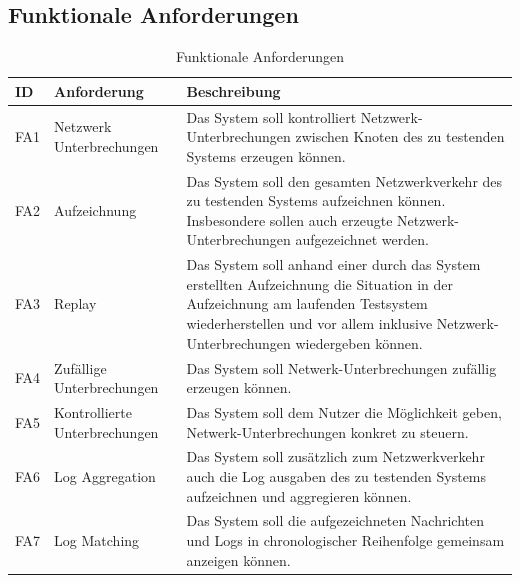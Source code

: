 \documentclass[12pt,a4paper]{report}
\begin{document}
\subsection{Funktionale Anforderungen}
\begin{table}[H]
	\centering
	\caption{Funktionale Anforderungen}
	\label{tab:fa}
	\begin{tabular}{|l|l|p{7cm}|}
		\hline
		ID   & Anforderung                   & Beschreibung                                                                                                                                                                                                          \\ \hline
		FA1  & Netzwerk Unterbrechungen      & Das System soll kontrolliert Netzwerk-Unterbrechungen zwischen Knoten des zu testenden Systems erzeugen können.                                                                                                       \\ \hline
		FA2  & Aufzeichnung                  & Das System soll den gesamten Netzwerkverkehr des zu testenden Systems aufzeichnen können. Insbesondere sollen auch erzeugte Netzwerk-Unterbrechungen aufgezeichnet werden.                                            \\ \hline
		FA3  & Replay                        & Das System soll anhand einer durch das System erstellten Aufzeichnung die Situation in der Aufzeichnung am laufenden Testsystem wiederherstellen und vor allem inklusive Netzwerk-Unterbrechungen wiedergeben können. \\ \hline
		FA4  & Zufällige Unterbrechungen     & Das System soll Netwerk-Unterbrechungen zufällig erzeugen können.                                                                                                                                                     \\ \hline
		FA5  & Kontrollierte Unterbrechungen & Das System soll dem Nutzer die Möglichkeit geben, Netwerk-Unterbrechungen konkret zu steuern.                                                                                                                         \\ \hline
		FA6  & Log Aggregation               & Das System soll zusätzlich zum Netzwerkverkehr auch die Log ausgaben des zu testenden Systems aufzeichnen und aggregieren können.                                                                                     \\ \hline
		FA7  & Log Matching                  & Das System soll die aufgezeichneten Nachrichten und Logs in chronologischer Reihenfolge gemeinsam anzeigen können.                                                                                                    \\ \hline

\end{tabular}
\end{table}
\end{document}
